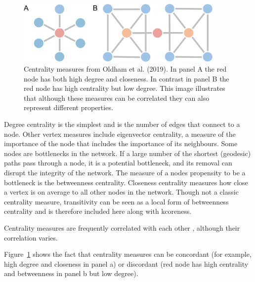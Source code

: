 \begin{figure}
    \centering
    \includegraphics[width=0.9\textwidth]{images/chapter3/centality_plos/journalpone0220061g001.PNG}
    \caption{Centrality measures from Oldham et al. (2019)\cite{oldham2019consistency}. In panel A the red node has both high degree and closeness. In contrast in panel B the red node has high centrality but low degree. This image illustrates that although these measures can be correlated they can also represent different properties.}
    \label{fig:centrality measures from Plos}
\end{figure}

Degree centrality is the simplest and is the number of edges that connect to a node. Other vertex measures include eigenvector centrality, a measure of the importance of the node that includes the importance of its neighbours\cite{bonacich1987power}.  Some nodes are bottlenecks in the network. If a large number of the shortest (geodesic) paths pass through a node, it is a potential bottleneck, and its removal can disrupt the integrity of the network. The measure of a nodes propensity to be a bottleneck is the betweenness centrality\cite{freeman1977set}. Closeness centrality measures how close a vertex is on average to all other nodes in the network. Though not a classic centrality measure, transitivity can be seen as a local form of betweenness centrality \cite{newman2018networks} and is therefore included here along with kcoreness. 

 Centrality measures are frequently correlated with each other \cite{valente2008correlated}, although their correlation varies\cite{oldham2019consistency}. 

Figure~\ref{fig:centrality measures from Plos} shows the fact that centrality measures can be concordant (for example, high degree and closeness in panel a) or discordant (red node has high centrality and betweenness in panel b but low degree). 

